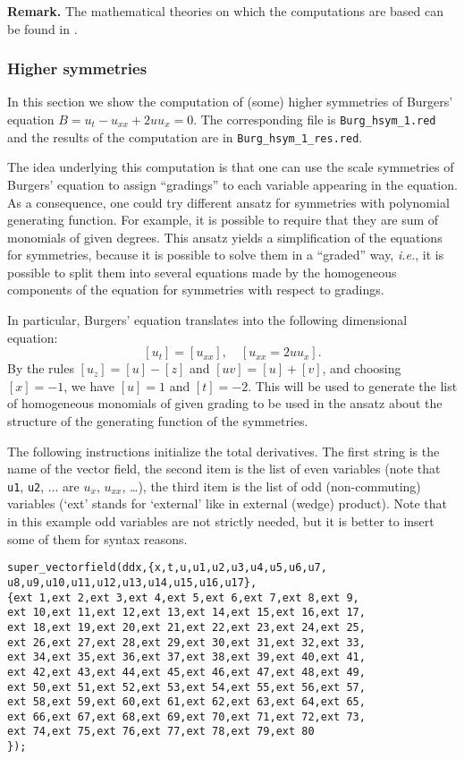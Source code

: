 \textbf{Remark.} The mathematical theories on which the computations are based
can be found in \cite{Krasilshchik:99,KerstenKrasilshchikVerboretsky:2004}.

\subsubsection{Higher symmetries}\label{sec:higher-symmetries}

In this section we show the computation of (some) higher symmetries of
Burgers' equation $B=u_t-u_{xx}+2uu_x=0$. The corresponding file is
\texttt{Burg\_hsym\_1.red} and the results of the computation are in
\texttt{Burg\_hsym\_1\_res.red}.

The idea underlying this computation is that one can use the scale symmetries
of Burgers' equation to assign ``gradings'' to each variable appearing in the
equation. As a consequence, one could try different ansatz for symmetries with
polynomial generating function. For example, it is possible to require that
they are sum of monomials of given degrees. This ansatz yields a simplification
of the equations for symmetries, because it is possible to solve them in a
``graded'' way, \emph{i.e.}, it is possible to split them into several
equations made by the homogeneous components of the equation for symmetries
with respect to gradings.

In particular, Burgers' equation translates into the following dimensional
equation:
\[
  [u_t]=[u_{xx}],\quad [u_{xx}=2uu_x].
\]
By the rules $[u_z]=[u]-[z]$ and $[uv]=[u]+[v]$, and choosing $[x]=-1$, we have
$[u]=1$ and $[t]=-2$. This will be used to generate the list of homogeneous
monomials of given grading to be used in the ansatz about the structure of the
generating function of the symmetries.

The following instructions initialize the total derivatives. The first string
is the name of the vector field, the second item is the list of even variables
(note that \texttt{u1}, \texttt{u2}, ... are $u_x$, $u_{xx}$, \dots), the third
item is the list of odd (non-commuting) variables (`ext' stands for `external'
like in external (wedge) product). Note that in this example odd variables are
not strictly needed, but it is better to insert some of them for syntax reasons.
\begin{verbatim}
super_vectorfield(ddx,{x,t,u,u1,u2,u3,u4,u5,u6,u7,
u8,u9,u10,u11,u12,u13,u14,u15,u16,u17},
{ext 1,ext 2,ext 3,ext 4,ext 5,ext 6,ext 7,ext 8,ext 9,
ext 10,ext 11,ext 12,ext 13,ext 14,ext 15,ext 16,ext 17,
ext 18,ext 19,ext 20,ext 21,ext 22,ext 23,ext 24,ext 25,
ext 26,ext 27,ext 28,ext 29,ext 30,ext 31,ext 32,ext 33,
ext 34,ext 35,ext 36,ext 37,ext 38,ext 39,ext 40,ext 41,
ext 42,ext 43,ext 44,ext 45,ext 46,ext 47,ext 48,ext 49,
ext 50,ext 51,ext 52,ext 53,ext 54,ext 55,ext 56,ext 57,
ext 58,ext 59,ext 60,ext 61,ext 62,ext 63,ext 64,ext 65,
ext 66,ext 67,ext 68,ext 69,ext 70,ext 71,ext 72,ext 73,
ext 74,ext 75,ext 76,ext 77,ext 78,ext 79,ext 80
});
\end{verbatim}


